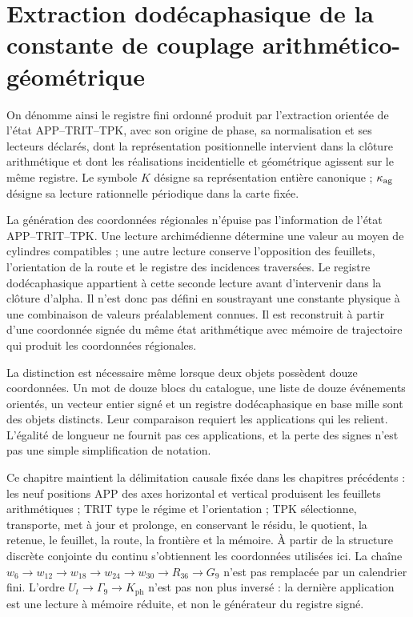 \section{Extraction dodécaphasique de la constante de couplage arithmético-géométrique}
\label{x_reciprocidad:sec:k-registro}

\begin{definition}
\label{x_reciprocidad:lib01:definicion}
On dénomme ainsi le registre fini ordonné produit par l’extraction
orientée de l’état APP--TRIT--TPK, avec son origine de phase, sa normalisation et
ses lecteurs déclarés, dont la représentation positionnelle intervient dans la
clôture arithmétique et dont les réalisations incidentielle et géométrique agissent
sur le même registre. Le symbole \(K\) désigne sa représentation
entière canonique ; \(\kappa_{\rm ag}\) désigne sa lecture rationnelle
périodique dans la carte fixée.
\end{definition}

La génération des coordonnées régionales n'épuise pas l'information de l'état APP--TRIT--TPK. Une lecture archimédienne détermine une valeur au moyen de cylindres compatibles ; une autre lecture conserve l'opposition des feuillets, l'orientation de la route et le registre des incidences traversées. Le registre dodécaphasique appartient à cette seconde lecture avant d'intervenir dans la clôture d'alpha. Il n'est donc pas défini en soustrayant une constante physique à une combinaison de valeurs préalablement connues. Il est reconstruit à partir d'une coordonnée signée du même état arithmétique avec mémoire de trajectoire qui produit les coordonnées régionales.

La distinction est nécessaire même lorsque deux objets possèdent douze
coordonnées. Un mot de douze blocs du catalogue, une liste de douze
événements orientés, un vecteur entier signé et un registre dodécaphasique en base mille sont des
objets distincts. Leur comparaison requiert les applications qui les
relient. L'égalité de longueur ne fournit pas ces applications, et la
perte des signes n'est pas une simple simplification de notation.

Ce chapitre maintient la délimitation causale fixée dans les chapitres précédents :
les neuf positions APP des axes horizontal et vertical produisent les
feuillets arithmétiques ; TRIT type le régime et l'orientation ; TPK sélectionne,
transporte, met à jour et prolonge, en conservant le résidu, le quotient, la retenue,
le feuillet, la route, la frontière et la mémoire. À partir de la structure discrète conjointe du
continu s'obtiennent les coordonnées utilisées ici. La chaîne
\(w_6\to w_{12}\to w_{18}\to w_{24}\to w_{30}\to R_{36}\to G_9\)
n'est pas remplacée par un calendrier fini. L'ordre
\(U_t\to\Gamma_9\to K_{\mathrm{ph}}\) n'est pas non plus inversé : la dernière application est une
lecture à mémoire réduite, et non le générateur du registre signé.



